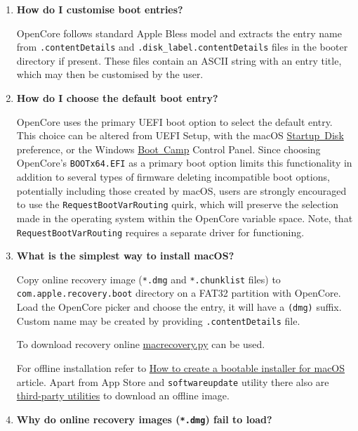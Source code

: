 \documentclass[]{article}
\makeatletter
\renewcommand{\label}[1]{%
\zref@wrapper@immediate{\oldlabel{#1}}}  %
\makeatother
\begin{document}
\begin{enumerate}
\item
  \textbf{How do I customise boot entries?}

  OpenCore follows standard Apple Bless model and extracts the entry name
  from \texttt{.contentDetails} and \texttt{.disk\_label.contentDetails} files in the
  booter directory if present. These files contain an ASCII string with an entry title,
  which may then be customised by the user.

\item
  \textbf{How do I choose the default boot entry?}

  OpenCore uses the primary UEFI boot option to select the default entry. This choice
  can be altered from UEFI Setup, with the macOS
  \href{https://support.apple.com/HT202796}{Startup Disk} preference, or the Windows
  \href{https://support.apple.com/guide/bootcamp-control-panel/start-up-your-mac-in-windows-or-macos-bcmp29b8ac66/mac}{Boot Camp} Control Panel.
  Since choosing OpenCore's \texttt{BOOTx64.EFI} as a primary boot option limits this
  functionality in addition to several types of firmware deleting incompatible boot options,
  potentially including those created by macOS, users are strongly encouraged to use the
  \texttt{RequestBootVarRouting} quirk, which will preserve the selection made in
  the operating system within the OpenCore variable space. Note, that \texttt{RequestBootVarRouting}
  requires a separate driver for functioning.

\item \label{reinstallmacos}
  \textbf{What is the simplest way to install macOS?}

  Copy online recovery image (\texttt{*.dmg} and \texttt{*.chunklist} files)
  to \texttt{com.apple.recovery.boot} directory on a FAT32 partition with OpenCore.
  Load the OpenCore picker and choose the entry, it will have a \texttt{(dmg)} suffix.
  Custom name may be created by providing \texttt{.contentDetails} file.

  To download recovery online
  \href{https://github.com/acidanthera/OpenCorePkg/blob/master/Utilities/macrecovery/macrecovery.py}{macrecovery.py}
  can be used.

  For offline installation refer to
  \href{https://support.apple.com/HT201372}{How to create a bootable installer for macOS}
  article. Apart from App Store and \texttt{softwareupdate} utility there also are
  \href{https://github.com/corpnewt/gibMacOS}{third-party utilities} to download an offline image.

\item
  \textbf{Why do online recovery images (\texttt{*.dmg}) fail to load?}


\end{enumerate}
\end{document}
